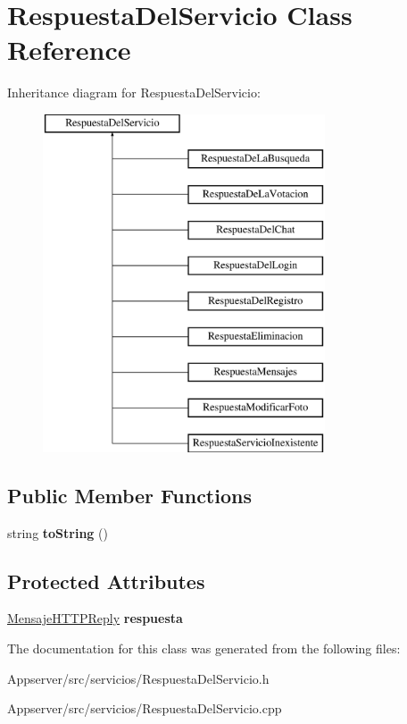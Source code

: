 \hypertarget{classRespuestaDelServicio}{}\section{Respuesta\+Del\+Servicio Class Reference}
\label{classRespuestaDelServicio}
Inheritance diagram for Respuesta\+Del\+Servicio\+:\begin{figure}[H]
\begin{center}
\leavevmode
\includegraphics[height=10.000000cm]{classRespuestaDelServicio}
\end{center}
\end{figure}
\subsection*{Public Member Functions}
\begin{DoxyCompactItemize}
\item 
string {\bfseries to\+String} ()\hypertarget{classRespuestaDelServicio_ab78ab6696438b9c62350750a5c4ca417}{}\label{classRespuestaDelServicio_ab78ab6696438b9c62350750a5c4ca417}

\end{DoxyCompactItemize}
\subsection*{Protected Attributes}
\begin{DoxyCompactItemize}
\item 
\hyperlink{classMensajeHTTPReply}{Mensaje\+H\+T\+T\+P\+Reply} {\bfseries respuesta}\hypertarget{classRespuestaDelServicio_af0086a8d7b4cbf4bc6a62d2548a7db52}{}\label{classRespuestaDelServicio_af0086a8d7b4cbf4bc6a62d2548a7db52}

\end{DoxyCompactItemize}


The documentation for this class was generated from the following files\+:\begin{DoxyCompactItemize}
\item 
Appserver/src/servicios/Respuesta\+Del\+Servicio.\+h\item 
Appserver/src/servicios/Respuesta\+Del\+Servicio.\+cpp\end{DoxyCompactItemize}
